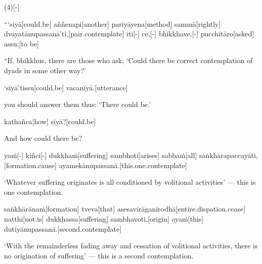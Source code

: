 \vskip 0.2in
\begin{samepage}
\begingl[glneveryline={\PaliGlossA,\PaliGlossB}]
(4)[-]
\endgl
\nopagebreak
\linespread{0.5}
\begin{spacin}{0.2}
{}
\end{spacin}
\vskip 12pt
\end{samepage}
\begin{samepage}
\begingl[glneveryline={\PaliGlossA,\PaliGlossB}]
“‘siyā[could.be] aññenapi[another] pariyāyena[method] sammā[rightly] dvayatānupassanā’ti,[pair.contemplate] iti[-] ce,[-] bhikkhave,[-] pucchitāro[asked] assu;[to be]
\endgl
\nopagebreak
\linespread{0.5}
\begin{spacin}{0.2}
{\PaliGlossFT “If, bhikkhus, there are those who ask, ‘Could there be correct contemplation of dyads in some other way?’}
\end{spacin}
\vskip 12pt
\end{samepage}
\begin{samepage}
\begingl[glneveryline={\PaliGlossA,\PaliGlossB}]
‘siyā’tissu[could.be] vacanīyā.[utterance]
\endgl
\nopagebreak
\linespread{0.5}
\begin{spacin}{0.2}
{\PaliGlossFT you should answer them thus: ‘There could be.’}
\end{spacin}
\vskip 12pt
\end{samepage}
\begin{samepage}
\begingl[glneveryline={\PaliGlossA,\PaliGlossB}]
kathañca[how] siyā?[could.be]
\endgl
\nopagebreak
\linespread{0.5}
\begin{spacin}{0.2}
{\PaliGlossFT And how could there be?}
\end{spacin}
\vskip 12pt
\end{samepage}
\begin{samepage}
\begingl[glneveryline={\PaliGlossA,\PaliGlossB}]
yaṁ[-] kiñci[-] dukkhaṁ[suffering] sambhoti[arises] sabbaṁ[all] saṅkhārapaccayāti,[formation.cause] ayamekānupassanā.[this.one.contemplate]
\endgl
\nopagebreak
\linespread{0.5}
\begin{spacin}{0.2}
{\PaliGlossFT ‘Whatever suffering originates is all conditioned by volitional activities’ — this is one contemplation.}
\end{spacin}
\vskip 12pt
\end{samepage}
\begin{samepage}
\begingl[glneveryline={\PaliGlossA,\PaliGlossB}]
saṅkhārānaṁ[formation] tveva[that] asesavirāganirodhā[entire.dispation.cease] natthi[not.is] dukkhassa[suffering] sambhavoti,[origin] ayaṁ[this] dutiyānupassanā.[second.contemplate]
\endgl
\nopagebreak
\linespread{0.5}
\begin{spacin}{0.2}
{\PaliGlossFT ‘With the remainderless fading away and cessation of volitional activities, there is no origination of suffering’ — this is a second contemplation.}
\end{spacin}
\vskip 12pt
\end{samepage}

